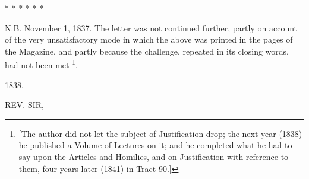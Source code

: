 *
*
*
*
*
*

N.B. November 1, 1837. The letter was not
continued further, partly on account of the very unsatisfactory mode
in which the above was printed in the pages of the Magazine, and
partly because the challenge, repeated in its closing words, had not
been met \footnote{[The author did not let the subject of Justification drop; the next
year (1838) he published a Volume of Lectures on it; and he completed
what he had to say upon the Articles and Homilies, and on
Justification with reference to them, four years later (1841) in Tract
90.]}.



1838.


REV. SIR,

